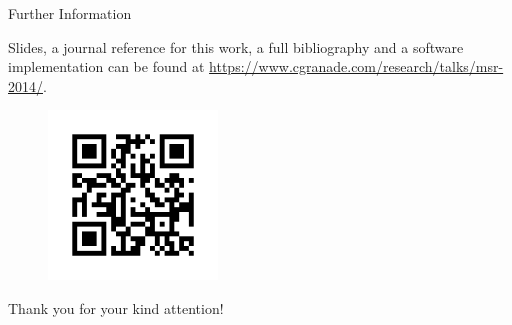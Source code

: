 \documentclass[xcolor=dvipsnames, compress]{beamer}
\begin{document}
\begin{frame}{Further Information}

  Slides, a journal reference for this work, a full bibliography and a software implementation can
  be found at \url{https://www.cgranade.com/research/talks/msr-2014/}.

  \begin{figure}
     \includegraphics[width=0.4\textwidth]{link}
  \end{figure}

  \begin{block}{}
    Thank you for your kind attention!
  \end{block}
\end{frame}


  
\end{document}
